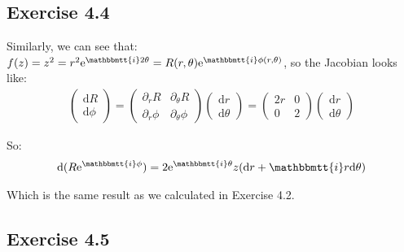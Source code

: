 \documentclass[]{ctexart}
\newcommand{\mi}{\mathbbmtt{i}}
\newcommand{\di}{\mathrm{d}}
\newcommand{\pa}{\partial}
\newcommand{\me}{\mathrm{e}}
\begin{document}
	\subsection{Exercise 4.4}
		Similarly, we can see that: $f(z)=z^2=r^2\me ^{\mi 2\theta}=R(r,\theta)\me ^{\mi \phi(r,\theta)}$, so the Jacobian looks like:
			\begin{equation*}
			\begin{aligned}
				\begin{pmatrix}
					\di R\\
					\di \phi
				\end{pmatrix}
				=
				\begin{pmatrix}
					\pa_rR & \pa_{\theta}R\\
					\pa_r\phi & \pa_{\theta}\phi
				\end{pmatrix}
				\begin{pmatrix}
					\di r\\
					\di \theta
				\end{pmatrix}
				=
				\begin{pmatrix}
					2r & 0\\
					0 & 2
				\end{pmatrix}
				\begin{pmatrix}
					\di r\\
					\di \theta
				\end{pmatrix}
			\end{aligned}
			\end{equation*}
		
		So: 
			\begin{equation*}
			\begin{aligned}
				\di(R\me ^{\mi \phi})=2\me ^{\mi \theta}z(\di r+\mi r \di \theta)
			\end{aligned}
			\end{equation*}
			
		Which is the same result as we calculated in Exercise 4.2. 
		
	\subsection{Exercise 4.5}
\end{document}
